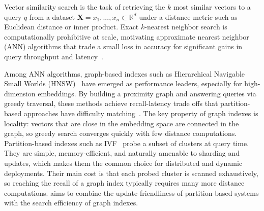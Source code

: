 \documentclass[sigconf,review,anonymous]{acmart}
\begin{document}
    Vector similarity search is the task of retrieving the $k$ most similar vectors to a query $q$ from a dataset $\mathbf{X} = {x_1,...,x_n} \subset \mathbb{R}^d$ under a distance metric such as Euclidean distance or inner product. Exact $k$-nearest neighbor search is computationally prohibitive at scale, motivating approximate nearest neighbor (ANN) algorithms that trade a small loss in accuracy for significant gains in query throughput and latency~\cite{malkov2018efficient, jegou2011searching, li2020annsurvey, aumuller2020ann}.

    Among ANN algorithms, graph-based indexes such as Hierarchical Navigable Small Worlds (HNSW)~\cite{malkov2018efficient} have emerged as performance leaders, especially for high-dimension embeddings. By building a proximity graph and answering queries via greedy traversal, these methods achieve recall-latency trade offs that partition-based approaches have difficulty matching~\cite{malkov2018efficient, jayaram2019diskann, li2020annsurvey, aumuller2020ann}. The key property of graph indexes is locality: vectors that are close in the embedding space are connected in the graph, so greedy search converges quickly with few distance computations. Partition-based indexes such as IVF~\cite{sivec2003ivf,jegou2011searching,douze2025faisslibrary} probe a subset of clusters at query time. They are simple, memory-efficient, and naturally amenable to sharding and updates, which makes them the common choice for distributed and dynamic deployments. Their main cost is that each probed cluster is scanned exhaustively, so reaching the recall of a graph index typically requires many more distance computations. \SystemName{} aims to combine the update-friendliness of partition-based systems with the search efficiency of graph indexes. %
\end{document}
